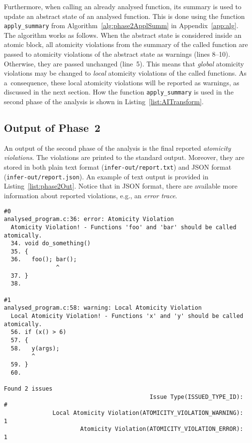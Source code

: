 Furthermore, when calling an already analysed function, its summary is used to update an abstract state of an analysed function. This is done using the function \texttt{apply\_summary} from Algorithm~\ref{alg:phase2ApplSumm} in Appendix~\ref{app:alg}. The algorithm works as follows. When the abstract state is considered inside an atomic block, all atomicity violations from the summary of the called function are passed to atomicity violations of the abstract state as warnings (lines 8--10). Otherwise, they are passed unchanged (line~5). This means that \emph{global} atomicity violations may be changed to \emph{local} atomicity violations of the called functions. As a~consequence, these local atomicity violations will be reported as warnings, as discussed in the next section. How the function \texttt{apply\_summary} is used in the second phase of the analysis is shown in Listing~\ref{list:AITransform}.

\subsection{Output of Phase~2}
\label{sec:phase2Output}

An output of the second phase of the analysis is the final reported \emph{atomicity violations}. The violations are printed to the standard output. Moreover, they are stored in both plain text format (\texttt{infer-out/report.txt}) and JSON format (\texttt{infer-out/report.json}). An example of text output is provided in Listing~\ref{list:phase2Out}. Notice that in JSON format, there are available more information about reported violations, e.g., an \emph{error trace}.

\begin{lstlisting}[label={list:phase2Out}, float=hbt, basicstyle=\ttfamily\small, numbers=none, caption={An example of an \emph{output of the second phase} of the analysis (\texttt{report.txt} file)}]
#0
analysed_program.c:36: error: Atomicity Violation
  Atomicity Violation! - Functions 'foo' and 'bar' should be called atomically.
  34. void do_something()
  35. {
  36.   foo(); bar();
               ^
  37. }
  38.

#1
analysed_program.c:58: warning: Local Atomicity Violation
  Local Atomicity Violation! - Functions 'x' and 'y' should be called atomically.
  56. if (x() > 6)
  57. {
  58.   y(args);
        ^
  59. }
  60.

Found 2 issues
                                          Issue Type(ISSUED_TYPE_ID): #
              Local Atomicity Violation(ATOMICITY_VIOLATION_WARNING): 1
                      Atomicity Violation(ATOMICITY_VIOLATION_ERROR): 1
\end{lstlisting}

